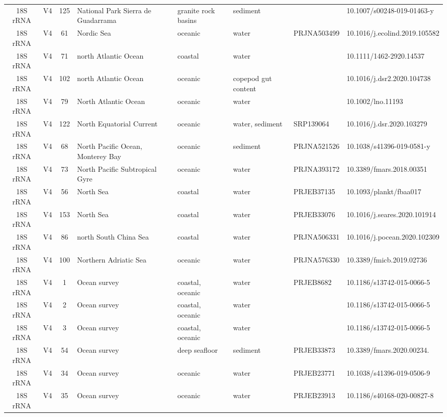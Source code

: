 \begin{longtable}{ccclllll}
  18S rRNA & V4 & 125 & National Park Sierra de Guadarrama & granite rock basins & sediment &  & 10.1007/s00248-019-01463-y \\ 
  18S rRNA & V4 & 61 & Nordic Sea & oceanic & water & PRJNA503499 & 10.1016/j.ecolind.2019.105582 \\ 
  18S rRNA & V4 & 71 & north Atlantic Ocean & coastal & water &  & 10.1111/1462-2920.14537 \\ 
  18S rRNA & V4 & 102 & north Atlantic Ocean & oceanic & copepod gut content &  & 10.1016/j.dsr2.2020.104738 \\ 
  18S rRNA & V4 & 79 & North Atlantic Ocean & oceanic & water &  & 10.1002/lno.11193 \\ 
  18S rRNA & V4 & 122 & North Equatorial Current & oceanic & water, sediment & SRP139064 & 10.1016/j.dsr.2020.103279 \\ 
  18S rRNA & V4 & 68 & North Pacific Ocean, Monterey Bay & oceanic & sediment & PRJNA521526 & 10.1038/s41396-019-0581-y \\ 
  18S rRNA & V4 & 73 & North Pacific Subtropical Gyre & oceanic & water & PRJNA393172 & 10.3389/fmars.2018.00351 \\ 
  18S rRNA & V4 & 56 & North Sea & coastal & water & PRJEB37135 & 10.1093/plankt/fbaa017 \\ 
  18S rRNA & V4 & 153 & North Sea & coastal & water & PRJEB33076 & 10.1016/j.seares.2020.101914 \\ 
  18S rRNA & V4 & 86 & north South China Sea & coastal & water & PRJNA506331 & 10.1016/j.pocean.2020.102309 \\ 
  18S rRNA & V4 & 100 & Northern Adriatic Sea & oceanic & water & PRJNA576330 & 10.3389/fmicb.2019.02736 \\ 
  18S rRNA & V4 & 1 & Ocean survey & coastal, oceanic & water & PRJEB8682 & 10.1186/s13742-015-0066-5 \\ 
  18S rRNA & V4 & 2 & Ocean survey & coastal, oceanic & water &  & 10.1186/s13742-015-0066-5 \\ 
  18S rRNA & V4 & 3 & Ocean survey & coastal, oceanic & water &  & 10.1186/s13742-015-0066-5 \\ 
  18S rRNA & V4 & 54 & Ocean survey & deep seafloor & sediment & PRJEB33873 & 10.3389/fmars.2020.00234. \\ 
  18S rRNA & V4 & 34 & Ocean survey & oceanic & water & PRJEB23771 & 10.1038/s41396-019-0506-9 \\ 
  18S rRNA & V4 & 35 & Ocean survey & oceanic & water & PRJEB23913 & 10.1186/s40168-020-00827-8 \\ 

\end{longtable}
